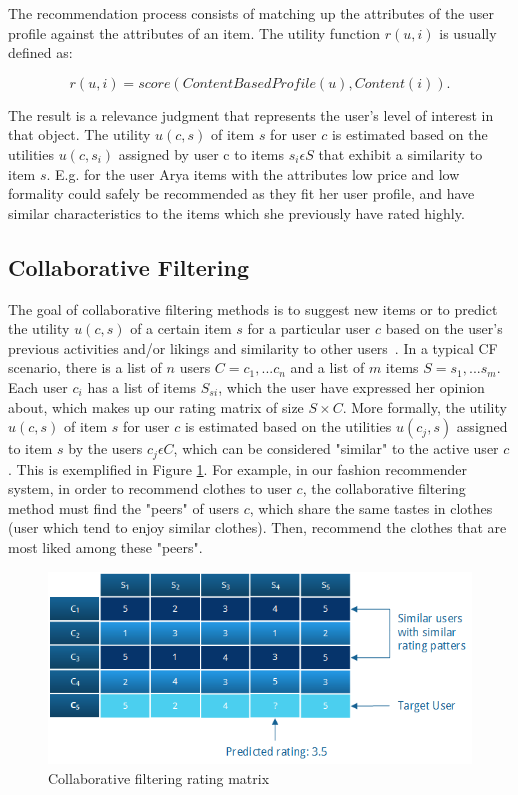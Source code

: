 The recommendation process consists of matching up the attributes of the user
profile against the attributes of an item. The utility function $r(u, i)$ is usually defined as:

\begin{equation}
r(u,i) = score(ContentBasedProfile(u), Content(i)).
\end{equation}

The result is a relevance judgment that represents the user's level of interest
in that object. The utility $u(c,s)$ of item $s$ for user $c$ is estimated based on the utilities $u(c, s_{i})$
assigned by user c to items $s_{i} \epsilon S$ that exhibit a similarity to
item $s$. E.g. for the user Arya items with the attributes low price and low
formality could safely be recommended as they fit her user profile, and have
similar characteristics to the items which she previously have rated highly.

\subsection{Collaborative Filtering}
\label{subsec:cf}

The goal of collaborative filtering methods is to suggest new items or to
predict the utility $u(c, s)$ of a certain item $s$ for a particular user $c$ based
on the user's previous activities and/or likings and similarity to other users~\cite{Sammut:2011:EML:2011878}.
In a typical CF scenario, there is a list of $n$ users $C = {c_{1}, ... c_{n}}$
and a list of $m$ items $S = {s_{1},...s_{m}}$. Each user $c_{i}$ has a list of
items $S_{si}$, which the user have expressed her opinion about, which makes up
our rating matrix of size $S \times C$. More formally, the utility $u(c, s)$ of
item $s$ for user $c$ is estimated based on the utilities $u(c_{j}, s)$
assigned to item $s$ by the users $c_{j} \epsilon C$, which can be considered
"similar" to the active user $c$. This is exemplified in Figure
\ref{figure:ratingmatrix}. For example, in our fashion recommender system, in
order to recommend clothes to user $c$, the collaborative filtering method must
find the "peers" of users $c$, which share the same tastes in clothes (user
which tend to enjoy similar clothes). Then, recommend the clothes that are most
liked among these "peers".

\begin{figure}[H]
    \includegraphics[scale=0.5]{image/ratingmatrix.png}
    \centering
    \caption[Collaborative filtering rating matrix]{Collaborative filtering rating matrix}
    \label{figure:ratingmatrix}
\end{figure}

